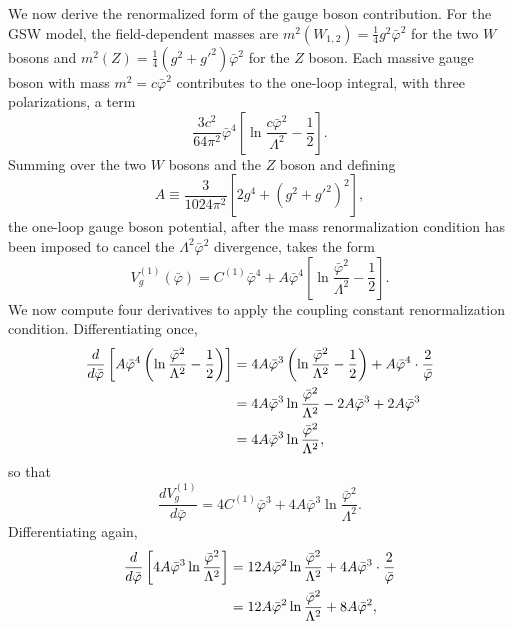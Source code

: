 We now derive the renormalized form of the gauge boson contribution.
For the GSW model, the field-dependent masses are $m^2(W_{1,2}) =
	\frac{1}{4}g^2\bar\varphi^2$ for the two $W$ bosons and $m^2(Z) =
	\frac{1}{4}(g^2+g'^2)\bar\varphi^2$ for the $Z$ boson. Each massive
gauge boson with mass $m^2 = c\bar\varphi^2$ contributes to the one-loop
integral, with three polarizations, a term
\begin{equation}
	\frac{3c^2}{64\pi^2}\bar\varphi^4
	\left[\ln\frac{c\bar\varphi^2}{\Lambda^2} - \frac{1}{2}\right].
\end{equation}
Summing over the two $W$ bosons and the $Z$ boson and defining
\begin{equation}
	A \equiv \frac{3}{1024\pi^2}\left[2g^4+(g^2+g'^2)^2\right],
\end{equation}
the one-loop gauge boson potential, after the mass renormalization
condition has been imposed to cancel the $\Lambda^2\bar\varphi^2$
divergence, takes the form
\begin{equation}
	V_g^{(1)}(\bar\varphi) = C^{(1)}\bar\varphi^4
	+ A\bar\varphi^4\left[\ln\frac{\bar\varphi^2}{\Lambda^2}
		- \frac{1}{2}\right].
\end{equation}
We now compute four derivatives to apply the coupling constant
renormalization condition. Differentiating once,
\begin{align}
	\frac{d}{d\bar\varphi}\left[A\bar\varphi^4
		                      \left(\ln\frac{\bar\varphi^2}{\Lambda^2}
		                      - \frac{1}{2}\right)\right]
	 & = 4A\bar\varphi^3\left(\ln\frac{\bar\varphi^2}{\Lambda^2}
	- \frac{1}{2}\right)
	+ A\bar\varphi^4\cdot\frac{2}{\bar\varphi} \notag            \\
	 & = 4A\bar\varphi^3\ln\frac{\bar\varphi^2}{\Lambda^2}
	- 2A\bar\varphi^3 + 2A\bar\varphi^3 \notag                   \\
	 & = 4A\bar\varphi^3\ln\frac{\bar\varphi^2}{\Lambda^2},
\end{align}
so that
\begin{equation}
	\frac{dV_g^{(1)}}{d\bar\varphi}
	= 4C^{(1)}\bar\varphi^3
	+ 4A\bar\varphi^3\ln\frac{\bar\varphi^2}{\Lambda^2}.
\end{equation}
Differentiating again,
\begin{align}
	\frac{d}{d\bar\varphi}\left[4A\bar\varphi^3
		                      \ln\frac{\bar\varphi^2}{\Lambda^2}\right]
	 & = 12A\bar\varphi^2\ln\frac{\bar\varphi^2}{\Lambda^2}
	+ 4A\bar\varphi^3\cdot\frac{2}{\bar\varphi} \notag      \\
	 & = 12A\bar\varphi^2\ln\frac{\bar\varphi^2}{\Lambda^2}
	+ 8A\bar\varphi^2,
\end{align}
